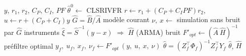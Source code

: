 \documentclass{style/presentation}
\begin{document}
\begin{frame}

    \vspace{-1mm}
    \begin{columns}[T]
        {\footnotesize
        \begin{algorithmic}[1]
            \Require $y$, $r_1$, $r_2$, $C_P$, $C_I$, $P\!F$
            \State $\hat{\theta}^{0} \gets$ CLSRIVFR
            \State $r \gets r_1 +  (C_P + C_I P\!F) r_2$, \quad $u \gets r + (C_P + C_I) y$
            \Do
                \State $\hat{G} = \hat{B}/\hat{A}$ \hfill {\footnotesize\color{jvgris}modèle courant}
                \State $\nu,\ x \gets$ simulation sans bruit par $\hat{G}$ \hfill {\footnotesize\color{jvgris}instruments}
                \State \alert{$\hat{\xi} = \hat{S}^{-1}(y - x)$ $\Rightarrow$ $\hat{H}$ (ARMA)} \hfill {\footnotesize\color{jvgris}bruit}
                \State \alert{$F'_{opt} \gets (\hat{A} \ \hat{H})^{-1}$} \hfill {\footnotesize\color{jvgris}préfiltre optimal}
                \State $y_f,\ u_f,\ x_f,\ \nu_f \gets F'_{opt}\,(y,\ u,\ x,\ \nu)$
                \State $\hat{\theta} = \left(Z_f^\top \Phi_f\right)^{-1} Z_f^\top Y_f$
            \Ensure $\hat{\theta}$, $\hat{H}$
        \end{algorithmic}}


\end{columns}
\end{frame}
\end{document}
